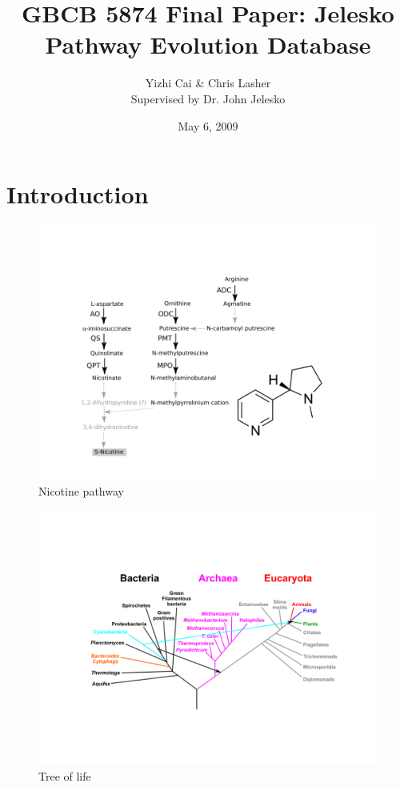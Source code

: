 \documentclass[11pt,letterpaper,twoside,english]{article}
\author{Yizhi Cai \& Chris Lasher\\
Supervised by Dr. John Jelesko}
\title{GBCB 5874 Final Paper: Jelesko Pathway Evolution Database}
\date{May 6, 2009}
\begin{document}
\maketitle

\section{Introduction}

%
\begin{figure}[h]
\begin{centering}
\includegraphics[width=1\linewidth]{figures/Nicotine_pathway}
\par\end{centering}

\caption{Nicotine pathway}

\end{figure}


%
\begin{figure}[h]
\begin{centering}
\includegraphics[width=1\linewidth]{figures/Tree_of_life}
\par\end{centering}

\caption{Tree of life}

\end{figure}
\end{document}
